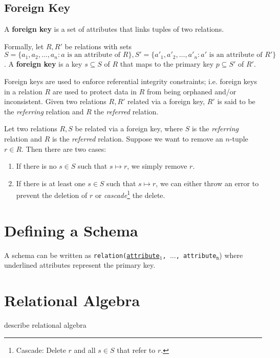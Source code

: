 \documentclass{report}
\newenvironment{definition}[1]{\begin{tcolorbox}[title={Definition: #1}]}{\end{tcolorbox}}
\renewcommand{\bf}[1]{\textbf{{#1}}}
\renewcommand{\tt}[1]{\texttt{{#1}}}
\renewcommand{\it}[1]{\textit{{#1}}}
\begin{document}
\subsection{Foreign Key}
\begin{definition}{Foreign Key}
    A \bf{foreign key} is a set of attributes that links tuples of two relations.\vspace{10pt}

    Formally, let $R, R'$ be relations with sets $S = \{a_1, a_2, \ldots, a_n : a 
        \text{ is an attribute of } R\}, S' = \{a'_1, a'_2, \ldots, a'_n : a' \text{ is an attribute of }
    R'\}$. A \bf{foreign key} is a key $s \subseteq S$ of $R$ that maps to the primary key 
    $p \subseteq S'$ of $R'$.
\end{definition}
Foreign keys are used to enforce referential integrity constraints; i.e. foreign keys in a 
relation $R$ are used to protect data in $R$ from being orphaned and/or inconsistent. Given two
relations $R, R'$ related via a foreign key, $R'$ is said to be the \it{referring} relation and 
$R$ the \it{referred} relation.

Let two relations $R, S$ be related via a foreign key, where $S$ is the \it{referring} relation
and $R$ is the \it{referred} relation. Suppose we want to remove an $n$-tuple $r \in R$. Then there
are two cases:
\begin{enumerate}[label=\textit{Case \arabic*}]
    \item If there is no $s \in S$ such that $s \mapsto r$, we simply remove $r$.
    \item If there is at least one $s \in S$ such that $s \mapsto r$, we can either throw an error
        to prevent the deletion of $r$ or \it{cascade}\footnote{Cascade: Delete $r$ and all 
        $s \in S$ that refer to $r$.} the delete.
\end{enumerate}





\section{Defining a Schema}
A schema can be written as \tt{relation(\underline{attribute$_{\tt{1}}$}, \tt{$\ldots$}, 
attribute$_{\tt{n}}$}) where underlined attributes represent the primary key.





\section{Relational Algebra}
describe relational algebra
\end{document}
